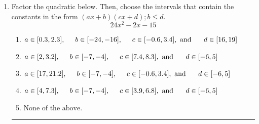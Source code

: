 \documentclass[14pt]{extbook}
\newcommand{\litem}[1]{\item#1\hspace*{-1cm}\rule{\textwidth}{0.4pt}}
\begin{document}
\begin{enumerate}
{\begin{enumerate}[label=\Alph*.]
\end{enumerate} }
\litem{
Factor the quadratic below. Then, choose the intervals that contain the constants in the form $(ax+b)(cx+d); b \leq d.$\[ 24x^{2} -2 x -15 \]\begin{enumerate}[label=\Alph*.]
\item \( a \in [0.3, 2.3], \hspace*{5mm} b \in [-24, -16], \hspace*{5mm} c \in [-0.6, 3.4], \text{ and } \hspace*{5mm} d \in [16, 19] \)
\item \( a \in [2, 3.2], \hspace*{5mm} b \in [-7, -4], \hspace*{5mm} c \in [7.4, 8.3], \text{ and } \hspace*{5mm} d \in [-6, 5] \)
\item \( a \in [17, 21.2], \hspace*{5mm} b \in [-7, -4], \hspace*{5mm} c \in [-0.6, 3.4], \text{ and } \hspace*{5mm} d \in [-6, 5] \)
\item \( a \in [4, 7.3], \hspace*{5mm} b \in [-7, -4], \hspace*{5mm} c \in [3.9, 6.8], \text{ and } \hspace*{5mm} d \in [-6, 5] \)
\item \( \text{None of the above.} \)


\end{enumerate}}
\end{enumerate}
\end{document}
